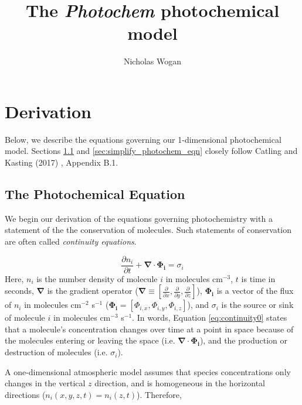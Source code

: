 \documentclass{article}
\begin{document}
\title{The \emph{Photochem} photochemical model}
\author{Nicholas Wogan}
\maketitle

\section{Derivation}
\label{sec:methods}

Below, we describe the equations governing our 1-dimensional photochemical model. Sections \ref{sec:photochem_eqn} and \ref{sec:simplify_photochem_eqn} closely follow Catling and Kasting (2017) \citep{Catling_2017}, Appendix B.1. 

\subsection{The Photochemical Equation} \label{sec:photochem_eqn}

We begin our derivation of the equations governing photochemistry with a statement of the the conservation of molecules. Such statements of conservation are often called \emph{continuity equations}.

\begin{equation} \label{eq:continuity0}
  \frac{\partial n_{i}}{\partial t} + \bm{\nabla} \cdot \bm{\Phi_{i}} = \sigma_i
\end{equation}
Here, $n_i$ is the number density of molecule $i$ in molecules cm$^{-3}$, $t$ is time in seconds, $\bm{\nabla}$ is the gradient operator ($\bm{\nabla} \equiv [\frac{\partial}{\partial x}, \frac{\partial}{\partial y}, \frac{\partial}{\partial z}]$), $\bm{\Phi_{i}}$ is a vector of the flux of $n_i$ in molecules cm$^{-2}$ s$^{-1}$ ($\bm{\Phi_{i}} = [\Phi_{i,x},\Phi_{i,y},\Phi_{i,z}]$), and $\sigma_i$ is the source or sink of molecule $i$ in molecules cm$^{-3}$ s$^{-1}$. In words, Equation \eqref{eq:continuity0} states that a molecule's concentration changes over time at a point in space because of the molecules entering or leaving the space (i.e. $\bm{\nabla} \cdot \bm{\Phi_{i}}$), and the production or destruction of molecules (i.e. $\sigma_i$). 

A one-dimensional atmospheric model assumes that species concentrations only changes in the vertical $z$ direction, and is homogeneous in the horizontal directions ($n_i(x,y,z,t) = n_i(z,t)$). Therefore,
\end{document}
